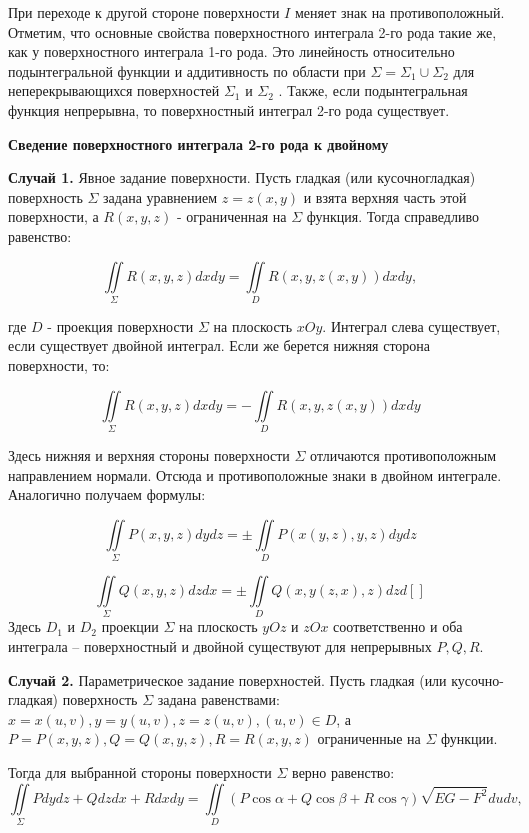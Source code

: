 При переходе к другой стороне поверхности $I$ меняет знак на противоположный. Отметим, что основные
свойства поверхностного интеграла 2-го рода такие же, как у поверхностного
интеграла 1-го рода. Это линейность относительно подынтегральной функции 
и аддитивность по области при $\Sigma=\Sigma_1\cup \Sigma_2$ для неперекрывающихся поверхностей $\Sigma_1$ и $\Sigma_2$ . Также, если подынтегральная функция непрерывна, то поверхностный интеграл 2-го рода существует.

\begin{center}
	\textbf{Сведение поверхностного интеграла 2-го рода к двойному}
\end{center}

\textbf{Случай 1.} Явное задание поверхности. Пусть гладкая (или кусочногладкая) поверхность $\Sigma$ задана уравнением $z = z(x, y)$ и взята верхняя часть
этой поверхности, а $R(x, y,z)$ - ограниченная на $\Sigma$ функция. Тогда справедливо равенство:

$$\iint\limits_\Sigma R(x, y, z)dxdy = \iint\limits_D R(x, y, z(x, y))dxdy,$$

 где $D$ - проекция поверхности $\Sigma$ на плоскость $xOy$. Интеграл слева существует, если существует двойной интеграл. Если же берется нижняя сторона поверхности, то:
 
$$\iint\limits_\Sigma R(x, y,z)dxdy = - \iint\limits_D R(x, y, z(x, y))dxdy$$

Здесь нижняя и верхняя стороны поверхности $\Sigma$ отличаются противоположным направлением нормали. Отсюда и противоположные знаки в двойном интеграле. Аналогично получаем формулы:

$$\iint\limits_\Sigma P(x, y,z)dydz = \pm \iint\limits_D P(x(y,z), y, z)dydz$$

$$\iint\limits_\Sigma Q(x, y,z)dzdx = \pm \iint\limits_D Q(x, y(z,x), z)dzd[]$$
Здесь $D_1$ и $D_2$ проекции $\Sigma$ на плоскость $yOz$ и $zOx$ соответственно и оба интеграла – поверхностный и двойной существуют для непрерывных $P,Q, R$.


\par\bigskip

\textbf{Случай 2.} Параметрическое задание поверхностей. Пусть гладкая (или
кусочно-гладкая) поверхность  $\Sigma$ задана равенствами:
$x = x(u, v), y = y(u, v), z = z(u, v), (u, v) \in D$,
а $P = P(x, y, z), Q = Q(x, y, z), R = R(x, y, z)$ ограниченные на  $\Sigma$ функции.

Тогда для выбранной стороны поверхности  $\Sigma$ верно равенство:
$$\iint\limits_\Sigma Pdydz+Qdzdx+Rdxdy = \iint\limits_D (P\cos\alpha + Q\cos\beta + R\cos\gamma)\sqrt{EG-F^2} dudv,$$

